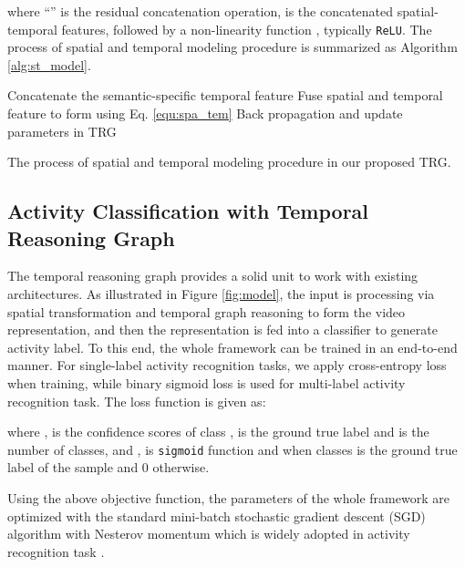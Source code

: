 \documentclass[conference,compsoc]{IEEEtran}
\begin{document}
    where ``'' is the residual concatenation operation,  is the concatenated spatial-temporal features, followed by a non-linearity function , typically \texttt{ReLU}. The process of spatial and temporal modeling procedure is summarized as Algorithm \ref{alg:st_model}.
    
\begin{algorithm}[ht]

	\BlankLine


	Concatenate the semantic-specific temporal feature \; 
Fuse spatial and temporal feature to form  using Eq. \ref{equ:spa_tem}\;
	Back propagation and update parameters in TRG\;
	\caption{The process of spatial and temporal modeling procedure in our proposed TRG.}
	\label{alg:st_model}
    \end{algorithm}
    
\subsection{Activity Classification with Temporal Reasoning Graph}
    The temporal reasoning graph provides a solid unit to work with existing architectures. As illustrated in Figure \ref{fig:model}, the input is processing via spatial transformation and temporal graph reasoning to form the video representation, and then the representation is fed into a classifier to generate activity label. To this end, the whole framework can be trained in an end-to-end manner. For single-label activity recognition tasks, we apply cross-entropy loss when training, while binary sigmoid loss is used for multi-label activity recognition task. The loss function is given as:

    where ,  is the confidence scores of class ,  is the ground true label and  is the number of classes, and ,  is \texttt{sigmoid} function and  when classes  is the ground true label of the sample and 0 otherwise.
    
    Using the above objective function, the parameters of the whole framework are optimized with the standard mini-batch stochastic gradient descent (SGD) algorithm with Nesterov momentum which is widely adopted in activity recognition task \cite{wang2016temporal, zhou2018temporal, wang2018videos}.
    
\end{document}
